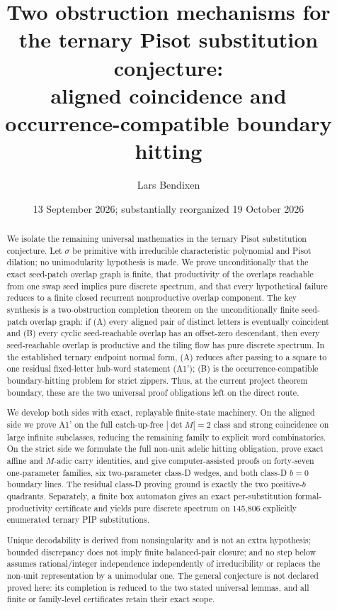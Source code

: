 \documentclass[11pt]{amsart}
\title[Two obstructions for the Pisot substitution conjecture]{Two obstruction mechanisms for the ternary Pisot substitution conjecture:\\ aligned coincidence and occurrence-compatible boundary hitting}
\author{Lars Bendixen}
\date{13 September 2026; substantially reorganized 19 October 2026}
\theoremstyle{plain}
\theoremstyle{definition}
\theoremstyle{remark}
\begin{document}
\begin{abstract}
We isolate the remaining universal mathematics in the ternary Pisot
substitution conjecture.  Let $\sigma$ be primitive with irreducible
characteristic polynomial and Pisot dilation; no unimodularity hypothesis is
made.  We prove unconditionally that the exact seed-patch overlap graph is
finite, that productivity of the overlaps reachable from one swap seed implies
pure discrete spectrum, and that every hypothetical failure reduces to a
finite closed recurrent nonproductive overlap component.  The key synthesis
is a two-obstruction completion theorem on the unconditionally finite
seed-patch overlap graph: if (A) every aligned pair of distinct letters is
eventually coincident and (B) every cyclic seed-reachable overlap has an
offset-zero descendant, then every seed-reachable overlap is productive and
the tiling flow has pure discrete spectrum.  In the established ternary endpoint
normal form, (A) reduces after passing to a square to one residual fixed-letter
hub-word statement (A1'); (B) is the occurrence-compatible boundary-hitting
problem for strict zippers.  Thus, at the current project theorem boundary,
these are the two universal proof obligations left on the direct route.

We develop both sides with exact, replayable finite-state machinery.  On the
aligned side we prove A1' on the full catch-up-free $|\det M|=2$ class and
strong coincidence on large infinite subclasses, reducing the remaining
family to explicit word combinatorics.  On the strict side we formulate the
full non-unit adelic hitting obligation, prove exact affine and $M$-adic carry
identities, and give computer-assisted proofs on forty-seven one-parameter
families, six two-parameter class-D wedges, and both class-D $b=0$ boundary
lines.  The residual class-D proving ground is exactly the two positive-$b$
quadrants.  Separately, a finite box automaton gives an exact per-substitution
formal-productivity certificate and yields pure discrete spectrum on 145,806
explicitly enumerated ternary PIP substitutions.

Unique decodability is derived from nonsingularity and is not an extra
hypothesis; bounded discrepancy does not imply finite balanced-pair closure;
and no step below assumes rational/integer independence independently of
irreducibility or replaces the non-unit representation by a unimodular one.
The general conjecture is not declared proved here: its completion is reduced
to the two stated universal lemmas, and all finite or family-level
certificates retain their exact scope.
\end{abstract}
\end{document}
